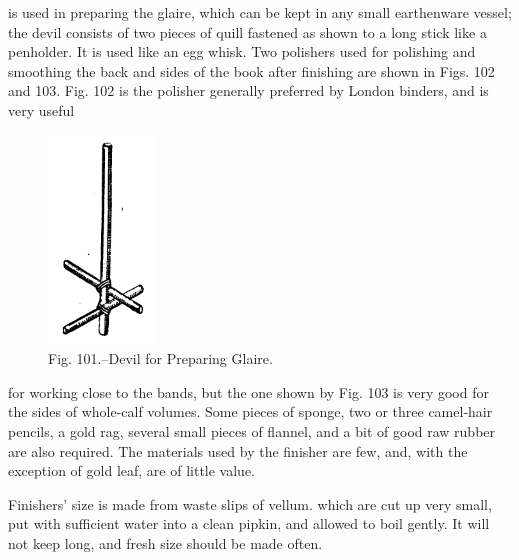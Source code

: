 \documentclass[twoside]{book}
\begin{document}
is used in preparing the glaire, which can be kept
in any small earthenware vessel; the devil consists
of two pieces of quill fastened as shown to a long
stick like a penholder. It is used like an egg whisk.
Two polishers used for polishing and smoothing the
back and sides of the book after finishing are shown
in Figs. 102 and 103. Fig. 102 is the polisher generally
preferred by London binders, and is very useful
	\begin{figure}[h]
		\centering
		\includegraphics[width=0.25\textwidth]{Figures/_101.png}
		\caption*{Fig. 101.--Devil for Preparing Glaire.}
	\end{figure}
for working close to the bands, but the one shown by
Fig. 103 is very good for the sides of whole-calf
volumes. Some pieces of sponge, two or three
camel-hair pencils, a gold rag, several small pieces
of flannel, and a bit of good raw rubber are also
required. The materials used by the finisher are
few, and, with the exception of gold leaf, are of little
value.

Finishers' size is made from waste slips of vellum.
which are cut up very small, put with sufficient
water into a clean pipkin, and allowed to boil gently.
It will not keep long, and fresh size should be made
often.

\pagebreak
\end{document}
